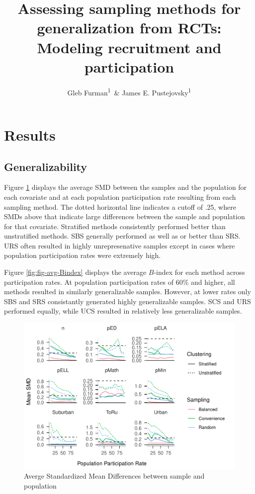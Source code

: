 \documentclass[man,floatsintext]{apa6}
\title{Assessing sampling methods for generalization from RCTs: Modeling recruitment and participation}
\author{Gleb Furman\textsuperscript{1}~\& James E. Pustejovsky\textsuperscript{1}}
\date{}
\affiliation{
\vspace{0.5cm}
\textsuperscript{1} University of Texas at Austin}
\begin{document}
\maketitle

\hypertarget{results}{%
\section{Results}\label{results}}

\hypertarget{generalizability}{%
\subsection{Generalizability}\label{generalizability}}

Figure \ref{fig:fig-SMD-by-Var} displays the average SMD between the samples and the population for each covariate and at each population participation rate resulting from each sampling method. The dotted horizontal line indicates a cutoff of .25, where SMDs above that indicate large differences between the sample and population for that covariate. Stratified methods consistently performed better than unstratified methods. SBS generally performed as well as or better than SRS. URS often resulted in highly unrepresenative samples except in cases where population participation rates were extremely high.

Figure \ref{fig:fig-avg-Bindex} displays the average \(B\)-index for each method across participation rates. At population participation rates of 60\% and higher, all methods resulted in similarly generalizable samples. However, at lower rates only SBS and SRS consistantly generated highly generalizable samples. SCS and URS performed equally, while UCS resulted in relatively less generalizable samples.

\begin{figure}
\centering
\includegraphics{GenSamp_Results_files/figure-latex/fig-SMD-by-Var-1.pdf}
\caption{\label{fig:fig-SMD-by-Var}Averge Standardized Mean Differences between sample and population}
\end{figure}
\end{document}

